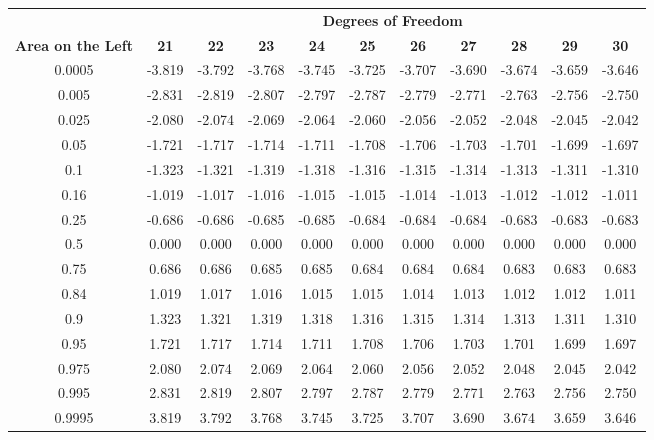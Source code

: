 \begin{center}
\begin{tabular}{ccccccccccc}
 & \multicolumn{10}{c}{\bf Degrees of Freedom} \\
{\bf Area on the Left} & {\bf 21} & {\bf 22} & {\bf 23} & {\bf 24} & {\bf 25} & {\bf 26} & {\bf 27} & {\bf 28} & {\bf 29} & {\bf 30}\\
0.0005 & -3.819 & -3.792 & -3.768 & -3.745 & -3.725 & -3.707 & -3.690 & -3.674 & -3.659 & -3.646\\
0.005 & -2.831 & -2.819 & -2.807 & -2.797 & -2.787 & -2.779 & -2.771 & -2.763 & -2.756 & -2.750\\
0.025 & -2.080 & -2.074 & -2.069 & -2.064 & -2.060 & -2.056 & -2.052 & -2.048 & -2.045 & -2.042\\
0.05 & -1.721 & -1.717 & -1.714 & -1.711 & -1.708 & -1.706 & -1.703 & -1.701 & -1.699 & -1.697\\
0.1 & -1.323 & -1.321 & -1.319 & -1.318 & -1.316 & -1.315 & -1.314 & -1.313 & -1.311 & -1.310\\
0.16 & -1.019 & -1.017 & -1.016 & -1.015 & -1.015 & -1.014 & -1.013 & -1.012 & -1.012 & -1.011\\
0.25 & -0.686 & -0.686 & -0.685 & -0.685 & -0.684 & -0.684 & -0.684 & -0.683 & -0.683 & -0.683\\
0.5 & 0.000 & 0.000 & 0.000 & 0.000 & 0.000 & 0.000 & 0.000 & 0.000 & 0.000 & 0.000\\
0.75 & 0.686 & 0.686 & 0.685 & 0.685 & 0.684 & 0.684 & 0.684 & 0.683 & 0.683 & 0.683\\
0.84 & 1.019 & 1.017 & 1.016 & 1.015 & 1.015 & 1.014 & 1.013 & 1.012 & 1.012 & 1.011\\
0.9 & 1.323 & 1.321 & 1.319 & 1.318 & 1.316 & 1.315 & 1.314 & 1.313 & 1.311 & 1.310\\
0.95 & 1.721 & 1.717 & 1.714 & 1.711 & 1.708 & 1.706 & 1.703 & 1.701 & 1.699 & 1.697\\
0.975 & 2.080 & 2.074 & 2.069 & 2.064 & 2.060 & 2.056 & 2.052 & 2.048 & 2.045 & 2.042\\
0.995 & 2.831 & 2.819 & 2.807 & 2.797 & 2.787 & 2.779 & 2.771 & 2.763 & 2.756 & 2.750\\
0.9995 & 3.819 & 3.792 & 3.768 & 3.745 & 3.725 & 3.707 & 3.690 & 3.674 & 3.659 & 3.646\\
\end{tabular}
\end{center}